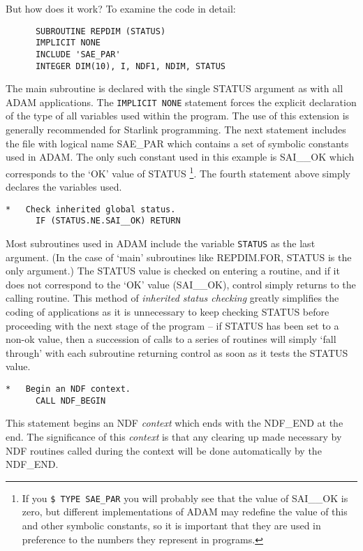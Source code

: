 But how does it work?
To examine the code in detail:
\begin{verbatim}
      SUBROUTINE REPDIM (STATUS)                                
      IMPLICIT NONE
      INCLUDE 'SAE_PAR'                                       
      INTEGER DIM(10), I, NDF1, NDIM, STATUS
\end{verbatim}
The  main subroutine is declared with the single STATUS argument
as with all ADAM applications.
The {\tt IMPLICIT NONE} statement forces the explicit declaration of the 
type of all variables used within the program. The use of this extension 
is generally recommended for Starlink programming.
The next statement includes the file with logical name SAE\_PAR which 
contains a set of symbolic constants used in ADAM.
The only such constant used in this example is SAI\_\_OK
which corresponds to  the `OK' value of STATUS
\footnote{If you  {\tt \$ TYPE SAE\_PAR} you will probably 
see that the value of  SAI\_\_OK  is zero, but different implementations 
of ADAM may redefine the value of this and other symbolic  constants, 
so it is important
that they are used in preference to the numbers they represent in programs.}.
The fourth statement above simply declares the variables used. 
\begin{verbatim}
*   Check inherited global status.
      IF (STATUS.NE.SAI__OK) RETURN
\end{verbatim}
Most subroutines used in ADAM include the variable {\tt STATUS} as the last
argument. (In the case of `main' subroutines like REPDIM.FOR, STATUS is the
only argument.)
The STATUS value is checked on entering a routine, and if it does not
correspond to the `OK' value (SAI\_\_OK),  control simply 
returns to the calling routine.
This method of {\sl inherited status checking\/}  greatly simplifies the 
coding of applications as it is unnecessary to keep checking STATUS 
before proceeding with the next stage of the program -- 
if STATUS has been set to a non-ok value, then  a 
succession of calls to a series of routines will simply `fall through'
with each subroutine returning control as soon as it tests the STATUS 
value.
\begin{verbatim}
*   Begin an NDF context.    
      CALL NDF_BEGIN                                          
\end{verbatim}
This statement begins an NDF {\sl context\/} which ends with the 
NDF\_END at the end.
The significance of this {\sl context\/} is that any
clearing up made necessary by NDF routines called
during the context will be done automatically by the NDF\_END.
